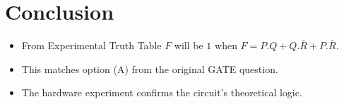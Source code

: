 \documentclass[a4paper,12pt]{article}
\begin{document}
\section*{Conclusion}
\begin{itemize}
    	\item From Experimental Truth Table $F$ will be $1$ when $F=P.Q+Q.\overline{R}+P.\overline{R}$. 
	\item This matches option (A) from the original GATE question.
    	\item The hardware experiment confirms the circuit's theoretical logic.
\end{itemize}
\end{document}
